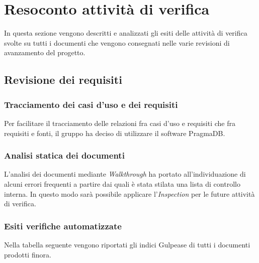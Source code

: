 \section{Resoconto attività di verifica}
In questa sezione vengono descritti e analizzati gli esiti delle attività
di verifica svolte su tutti i documenti che vengono consegnati nelle varie 
revisioni di avanzamento del progetto.

\subsection{Revisione dei requisiti}
\subsubsection{Tracciamento dei casi d'uso e dei requisiti}
Per facilitare il tracciamento delle relazioni fra casi d'uso e requisiti che
fra requisiti e fonti, il gruppo ha deciso di utilizzare il software PragmaDB.

\subsubsection{Analisi statica dei documenti}
L'analisi dei documenti mediante \textit{Walkthrough}\glo{} ha portato 
all'individuazione di alcuni errori frequenti a partire dai quali è stata 
stilata una lista di controllo interna. In questo modo sarà possibile applicare
l'\textit{Inspection}\glo{} per le future attività di verifica.

\subsubsection{Esiti verifiche automatizzate}

Nella tabella seguente vengono riportati gli indici Gulpease\glo{} di tutti
i documenti prodotti finora.

	
